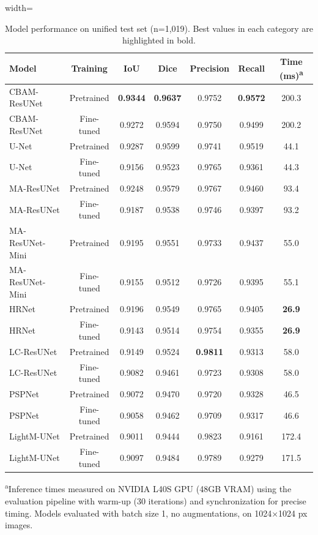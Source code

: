 \documentclass[preprint,12pt]{elsarticle}
\begin{document}
\begin{table}[h]
\centering
\caption{Model performance on unified test set (n=1,019). Best values in each category are highlighted in bold.}
\label{tab:model_performance}
\begin{adjustbox}{width=\textwidth}
\begin{tabular}{lcccccc}
\toprule
\textbf{Model} & \textbf{Training} & \textbf{IoU} & \textbf{Dice} & \textbf{Precision} & \textbf{Recall} & \textbf{Time (ms)}\textsuperscript{a} \\
\midrule
CBAM-ResUNet & Pretrained & \textbf{0.9344} & \textbf{0.9637} & 0.9752 & \textbf{0.9572} & 200.3 \\
CBAM-ResUNet & Fine-tuned & 0.9272 & 0.9594 & 0.9750 & 0.9499 & 200.2 \\
U-Net & Pretrained & 0.9287 & 0.9599 & 0.9741 & 0.9519 & 44.1 \\
U-Net & Fine-tuned & 0.9156 & 0.9523 & 0.9765 & 0.9361 & 44.3 \\
MA-ResUNet & Pretrained & 0.9248 & 0.9579 & 0.9767 & 0.9460 & 93.4 \\
MA-ResUNet & Fine-tuned & 0.9187 & 0.9538 & 0.9746 & 0.9397 & 93.2 \\
MA-ResUNet-Mini & Pretrained & 0.9195 & 0.9551 & 0.9733 & 0.9437 & 55.0 \\
MA-ResUNet-Mini & Fine-tuned & 0.9155 & 0.9512 & 0.9726 & 0.9395 & 55.1 \\
HRNet & Pretrained & 0.9196 & 0.9549 & 0.9765 & 0.9405 & \textbf{26.9} \\
HRNet & Fine-tuned & 0.9143 & 0.9514 & 0.9754 & 0.9355 & \textbf{26.9} \\
LC-ResUNet & Pretrained & 0.9149 & 0.9524 & \textbf{0.9811} & 0.9313 & 58.0 \\
LC-ResUNet & Fine-tuned & 0.9082 & 0.9461 & 0.9723 & 0.9308 & 58.0 \\
PSPNet & Pretrained & 0.9072 & 0.9470 & 0.9720 & 0.9328 & 46.5 \\
PSPNet & Fine-tuned & 0.9058 & 0.9462 & 0.9709 & 0.9317 & 46.6 \\
LightM-UNet & Pretrained & 0.9011 & 0.9444 & 0.9823 & 0.9161 & 172.4 \\
LightM-UNet & Fine-tuned & 0.9097 & 0.9484 & 0.9789 & 0.9279 & 171.5 \\
\bottomrule
\end{tabular}
\end{adjustbox}
\footnotesize{\textsuperscript{a}Inference times measured on NVIDIA L40S GPU (48GB VRAM) using the evaluation pipeline with warm-up (30 iterations) and synchronization for precise timing. Models evaluated with batch size 1, no augmentations, on 1024×1024 px images.}
\end{table}
\end{document}
